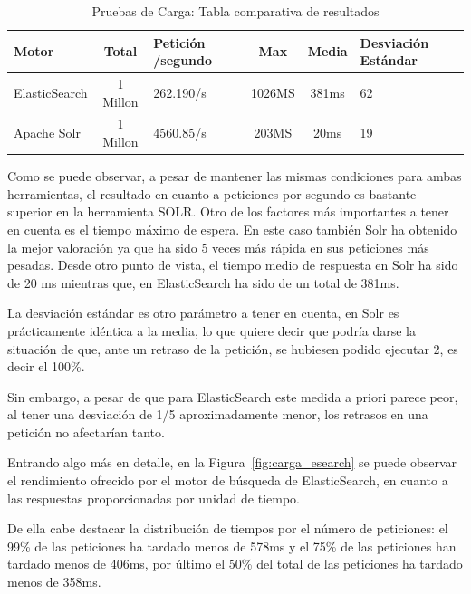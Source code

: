 \documentclass[runningheads,a4paper]{llncs}
\theoremstyle{break}
\newcommand{\rowstyle}[1]{\gdef\currentrowstyle{#1}%
  #1\ignorespaces
}
\begin{document}
\bgroup
\setlength{\tabcolsep}{10pt}
\def\arraystretch{1.6}
\begin{table}
\begin{center}
\begin{tabular}{l|c|p{2cm}|c|c|p{2cm}}
\rowstyle{\bfseries} Motor & \rowstyle{\bfseries} Total & \rowstyle{\bfseries} Petición /\newline segundo & \rowstyle{\bfseries} Max & \rowstyle{\bfseries} Media & \rowstyle{\bfseries} Desviación \newline Estándar \\ \hline
ElasticSearch & 1 Millon &  262.190/s & 1026MS & 381ms & 62 \\
Apache Solr   & 1 Millon &  4560.85/s & 203MS & 20ms & 19 \\ \hline

\end{tabular}
\end{center}
\vspace{1em}
\caption{Pruebas de Carga: Tabla comparativa de resultados\label{tab:carga}}
\end{table}
\egroup
\vspace{-1.5em}

Como se puede observar, a pesar de mantener las mismas condiciones para ambas herramientas, el resultado en cuanto a peticiones por segundo es bastante superior en la herramienta SOLR. Otro de los factores más importantes a tener en cuenta es el tiempo máximo de espera. En este caso también Solr ha obtenido la mejor valoración ya que ha sido 5 veces más rápida en sus peticiones más pesadas. Desde otro punto de vista, el tiempo medio de respuesta en Solr ha sido de 20 ms mientras que, en ElasticSearch ha sido de un total de 381ms. 

La desviación estándar es otro parámetro a tener en cuenta, en Solr es prácticamente idéntica a la media, lo que quiere decir que podría darse la situación de que, ante un retraso de la petición, se hubiesen podido ejecutar 2, es decir el 100\%. 

Sin embargo, a pesar de que para ElasticSearch este medida a priori parece peor, al tener una desviación de 1/5 aproximadamente menor, los retrasos en una petición no afectarían tanto. 

Entrando algo más en detalle, en la Figura~\ref{fig:carga_esearch} se puede observar el rendimiento ofrecido por el motor de búsqueda de ElasticSearch, en cuanto a las respuestas proporcionadas por unidad de tiempo. 

De ella cabe destacar la distribución de tiempos por el número de peticiones: el 99\% de las peticiones ha tardado menos de 578ms y el 75\% de las peticiones han tardado menos de 406ms, por último el 50\% del total de las peticiones ha tardado menos de 358ms.
\end{document}
